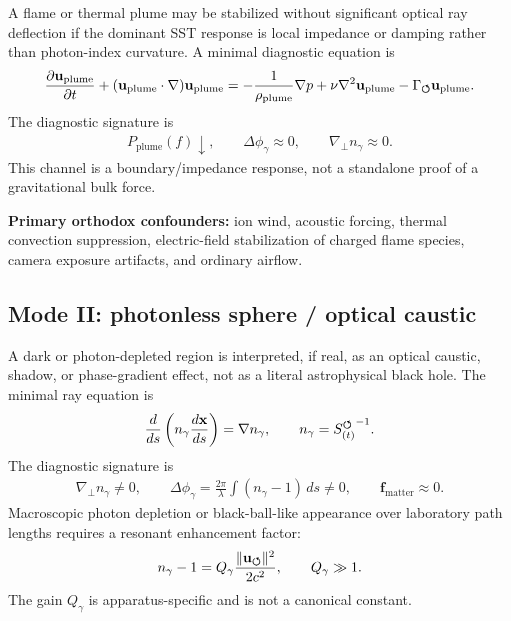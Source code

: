 A flame or thermal plume may be stabilized without significant optical ray
deflection if the dominant SST response is local impedance or damping rather
than photon-index curvature. A minimal diagnostic equation is
\begin{align}
    \frac{\partial\mathbf{u}_{\mathrm{plume}}}{\partial t}
    +
    (\mathbf{u}_{\mathrm{plume}}\cdot\nabla)\mathbf{u}_{\mathrm{plume}}
    =
    -\frac{1}{\rho_{\mathrm{plume}}}\nabla p
    +
    \nu\nabla^2\mathbf{u}_{\mathrm{plume}}
    -
    \Gamma_{\boldsymbol{\circlearrowleft}}\mathbf{u}_{\mathrm{plume}}.
    \label{eq:rt_flame_lock_plume_equation}
\end{align}
The diagnostic signature is
\begin{align}
    P_{\mathrm{plume}}(f)\downarrow,
    \qquad
    \Delta\phi_\gamma\approx0,
    \qquad
    \nabla_\perp n_\gamma\approx0.
    \label{eq:rt_flame_lock_signature}
\end{align}
This channel is a boundary/impedance response, not a standalone proof of a
gravitational bulk force.

\textbf{Primary orthodox confounders:}
ion wind, acoustic forcing, thermal convection suppression, electric-field
stabilization of charged flame species, camera exposure artifacts, and ordinary
airflow.

\subsection{Mode II: photonless sphere / optical caustic}

A dark or photon-depleted region is interpreted, if real, as an optical caustic,
shadow, or phase-gradient effect, not as a literal astrophysical black hole. The
minimal ray equation is
\begin{align}
    \frac{d}{ds}
    \left(
    n_\gamma\frac{d\mathbf{x}}{ds}
    \right)
    =
    \nabla n_\gamma,
    \qquad
    n_\gamma={S_{(t)}^{\boldsymbol{\circlearrowleft}}}^{-1}.
    \label{eq:rt_photonless_caustic_ray}
\end{align}
The diagnostic signature is
\begin{align}
    \nabla_\perp n_\gamma\neq0,
    \qquad
    \Delta\phi_\gamma
    =
    \frac{2\pi}{\lambda}
    \int(n_\gamma-1)\,ds
    \neq0,
    \qquad
    \mathbf{f}_{\mathrm{matter}}\approx0.
    \label{eq:rt_photonless_caustic_signature}
\end{align}
Macroscopic photon depletion or black-ball-like appearance over laboratory path
lengths requires a resonant enhancement factor:
\begin{align}
    n_\gamma-1
    =
    Q_\gamma
    \frac{\lVert\mathbf{u}_{\boldsymbol{\circlearrowleft}}\rVert^2}{2c^2},
    \qquad
    Q_\gamma\gg1.
    \label{eq:rt_optical_gain_factor}
\end{align}
The gain \(Q_\gamma\) is apparatus-specific and is not a canonical constant.

